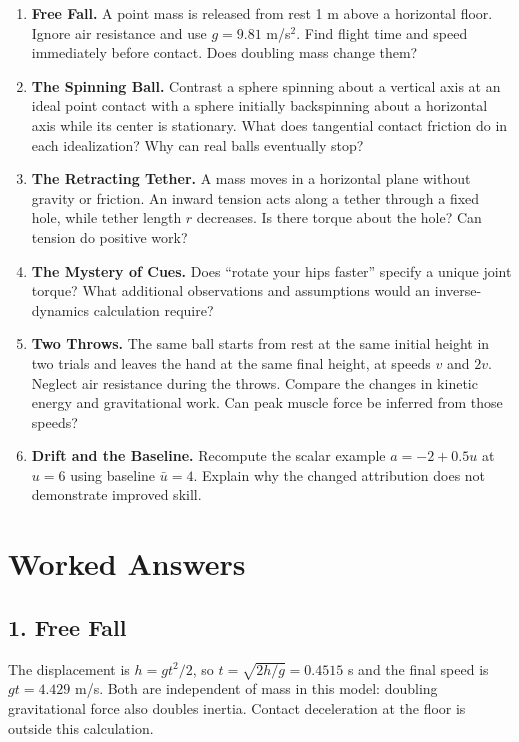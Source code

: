 \begin{enumerate}
\def\labelenumi{\arabic{enumi}.}

\item
  \textbf{Free Fall.} A point mass is released from rest 1 m above a horizontal floor. Ignore air resistance and use \(g=9.81\) m/s\(^2\). Find flight time and speed immediately before contact. Does doubling mass change them?
\item
  \textbf{The Spinning Ball.} Contrast a sphere spinning about a vertical axis at an ideal point contact with a sphere initially backspinning about a horizontal axis while its center is stationary. What does tangential contact friction do in each idealization? Why can real balls eventually stop?
\item
  \textbf{The Retracting Tether.} A mass moves in a horizontal plane without gravity or friction. An inward tension acts along a tether through a fixed hole, while tether length \(r\) decreases. Is there torque about the hole? Can tension do positive work?
\item
  \textbf{The Mystery of Cues.} Does ``rotate your hips faster'' specify a unique joint torque? What additional observations and assumptions would an inverse-dynamics calculation require?
\item
  \textbf{Two Throws.} The same ball starts from rest at the same initial height in two trials and leaves the hand at the same final height, at speeds \(v\) and \(2v\). Neglect air resistance during the throws. Compare the changes in kinetic energy and gravitational work. Can peak muscle force be inferred from those speeds?
\item
  \textbf{Drift and the Baseline.} Recompute the scalar example \(a=-2+0.5u\) at \(u=6\) using baseline \(\bar u=4\). Explain why the changed attribution does not demonstrate improved skill.
\end{enumerate}

\section{Worked Answers}\label{ch01:worked-answers}

\subsection*{1. Free Fall}\label{ch01:free-fall}

The displacement is \(h=gt^2/2\), so \(t=\sqrt{2h/g}=0.4515\) s and the final speed is \(gt=4.429\) m/s. Both are independent of mass in this model: doubling gravitational force also doubles inertia. Contact deceleration at the floor is outside this calculation.

